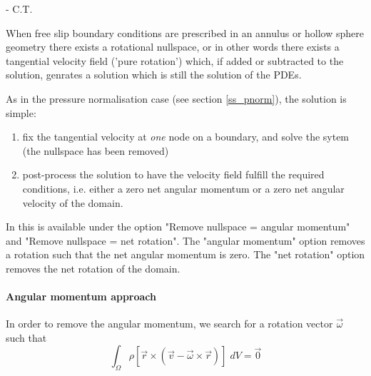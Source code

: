 {\tiny \date{\today} - C.T.}

When free slip boundary conditions are prescribed in an annulus or
hollow sphere geometry there exists a rotational nullspace, or in other words there exists
a tangential velocity field ('pure rotation') which, 
if added or subtracted to the solution, genrates a solution which is still the solution of the PDEs. 

As in the pressure normalisation case (see section \ref{ss_pnorm}), the solution is simple:
\begin{enumerate}
\item fix the tangential velocity at {\it one} node on a boundary, and solve the sytem (the nullspace 
has been removed)
\item post-process the solution to have the velocity field fulfill the required conditions, i.e.
either a zero net angular momentum or a zero net angular velocity of the domain. 
\end{enumerate}

\begin{remark}
In \aspect{} this is available under the option 
"Remove nullspace = angular momentum" and "Remove nullspace = net rotation".
The "angular momentum" option removes a rotation such that the net angular momentum is zero.
The "net rotation" option removes the net rotation of the domain.
\end{remark}

\paragraph{Angular momentum approach}

In order to remove the angular momentum, we search for a rotation
vector ${\vec \omega}$ such that
\begin{equation}
\int_\Omega \rho[{\vec r} \times ({\vec v}-{\vec \omega} \times {\vec r})] \; dV= \vec 0
\end{equation}

